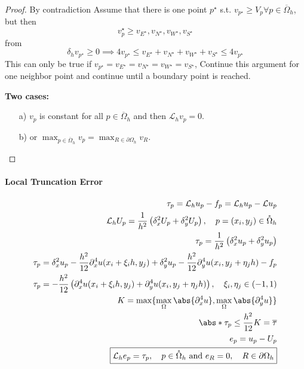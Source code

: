 \begin{proof}{By contradiction}{}
  Assume that there is one point \(p^\star\) s.t. \(v_{p^\star} \geq V_p \forall p \in \overline{\Omega}_h\),
  but then
  \[
    v_p^\star \geq v_{E^\star}, v_{N^\star}, v_{W^\star}, v_{S^\star}
  \]
  from
  \[
    \delta_h v_{p^\star} \geq 0 \implies 4v_{p^\star} \leq v_{E^\star} + v_{N^\star} + v_{W^\star} + v_{S^\star} \leq 4v_{p^\star}
  \]
  This can only be true if \(v_{p^\star} = v_{E^\star} = v_{N^\star} = v_{W^\star} = v_{S^\star}\),
  Continue this argument for one neighbor point and continue until a boundary point is reached.

  \textbf{Two cases:}
  \begin{itemize}
    \item[a)] \(v_p\) is constant for all \(p \in \overline{\Omega}_h\) and then \(\mathcal{L}_h v_p = 0\).
    \item[b)] or \(\max_{p \in \overline{\Omega}_h} v_p = \max_{R \in \partial\Omega_h} v_R\).
  \end{itemize}
\end{proof}

\paragraph{Local Truncation Error}

\begin{align*}
  \tau_p = \mathcal{L}_h u_p - f_p = \mathcal{L}_h u_p - \mathcal{L}u_p                                                                                 \\
  \mathcal{L}_h U_p = \frac{1}{h^2}\left(\delta_x^2 U_p + \delta_y^2 U_p\right), \quad p = (x_i, y_j) \in \mathring{\Omega}_h                           \\
  \tau_p = \frac{1}{h^2}\left(\delta_x^2 u_p + \delta_y^2 u_p\right)                                                                                    \\
  \tau_p = \delta_x^2 u_p - \frac{h^2}{12}\partial_x^4 u(x_i + \xi_i h, y_j) + \delta_y^2 u_p - \frac{h^2}{12}\partial_y^4 u(x_i, y_j + \eta_j h) - f_p \\
  \tau_p = - \frac{h^2}{12}\left(\partial_x^4 u(x_i + \xi_i h, y_j) + \partial_y^4 u(x_i, y_j + \eta_j h)\right), \quad \xi_i, \eta_j \in (-1, 1)       \\
  K = \max\{ \max_{\Omega} \abs{\partial_x^4 u}, \max_{\Omega} \abs{\partial_y^4 u}\}                                                                   \\
  \abs*{\tau_p} \leq \frac{h^2}{12} K = \overline{\tau}                                                                                                 \\
  e_p = u_p - U_p                                                                                                                                       \\
  \boxed{\mathcal{L}_h e_p = \tau_p, \quad p \in \mathring{\Omega}_h \text{ and } e_R = 0, \quad R \in \partial\Omega_h}
\end{align*}


